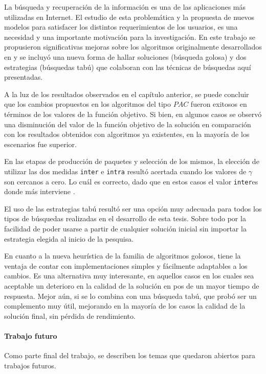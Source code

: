 La búsqueda y recuperación de la información es una de las aplicaciones más utilizadas en Internet. El estudio de esta problemática y la propuesta de nuevos modelos para satisfacer los distintos requerimientos de los usuarios, es una necesidad y una importante motivación para la investigación. En este trabajo se propusieron significativas mejoras sobre los algoritmos originalmente desarrollados en \cite{journals/tkde/Amer-YahiaBCFMZ14} y se incluyó una nueva forma de hallar soluciones (búsqueda golosa) y dos estrategias (búsquedas tabú) que colaboran con las técnicas de búsquedas aquí presentadas.

A la luz de los resultados observados en el capítulo anterior, se puede concluir que los cambios propuestos en los algoritmos del tipo $PAC$ fueron exitosos en términos de los valores de la función objetivo. Si bien, en algunos  casos se observó una disminución del valor de la función objetivo de la solución en comparación con los resultados obtenidos con algoritmos ya existentes, en la mayoría de los escenarios fue superior. 

En las etapas de producción de paquetes y selección de los mismos, la elección de utilizar las dos medidas \texttt{inter} e \texttt{intra} resultó acertada cuando los valores de $\gamma$ son cercanos a cero. Lo cuál es correcto, dado que en estos casos el valor \texttt{inter}es donde más interviene .

El uso de las estrategias tabú resultó ser una opción muy adecuada para todos los tipos de búsquedas realizadas en el desarrollo de esta tesis. Sobre todo por la facilidad de poder usarse a partir de cualquier solución inicial sin importar la estrategia elegida al inicio de la pesquisa.

En cuanto a la nueva heurística de la familia de algoritmos golosos, tiene la ventaja de contar con implementaciones simples y fácilmente adaptables a los cambios. Es una alternativa muy interesante, en aquellos casos en los cuales sea aceptable un deterioro en la calidad de la solución en pos de un mayor tiempo de respuesta. Mejor aún, si se lo combina con una búsqueda tabú, que probó ser un complemento muy útil, mejorando en la mayoría de los casos la calidad de la solución final, sin pérdida de rendimiento. 

\paragraph{Trabajo futuro} Como parte final del trabajo, se describen los temas que quedaron abiertos para trabajos futuros. 

